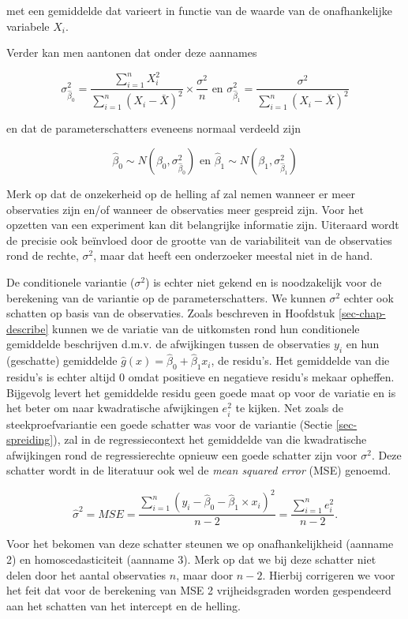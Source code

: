 \documentclass[
  dutch,
  letterpaper,
  12pt]{book}
\theoremstyle{definition}
\theoremstyle{definition}
\theoremstyle{definition}
\theoremstyle{remark}
\begin{document}
met een gemiddelde dat varieert in functie van de waarde van de
onafhankelijke variabele \(X_i\).

Verder kan men aantonen dat onder deze aannames

\[\sigma^2_{\hat{\beta}_0}=\frac{\sum\limits_{i=1}^n X^2_i}{\sum\limits_{i=1}^n (X_i-\bar X)^2} \times\frac{\sigma^2}{n} \text{ en } \sigma^2_{\hat{\beta}_1}=\frac{\sigma^2}{\sum\limits_{i=1}^n (X_i-\bar X)^2}\]

en dat de parameterschatters eveneens normaal verdeeld zijn

\[\hat\beta_0 \sim N\left(\beta_0,\sigma^2_{\hat \beta_0}\right) \text{ en } \hat\beta_1 \sim N\left(\beta_1,\sigma^2_{\hat \beta_1}\right)\]

Merk op dat de onzekerheid op de helling af zal nemen wanneer er meer
observaties zijn en/of wanneer de observaties meer gespreid zijn. Voor
het opzetten van een experiment kan dit belangrijke informatie zijn.
Uiteraard wordt de precisie ook beïnvloed door de grootte van de
variabiliteit van de observaties rond de rechte, \(\sigma^2\), maar dat
heeft een onderzoeker meestal niet in de hand.

De conditionele variantie (\(\sigma^2\)) is echter niet gekend en is
noodzakelijk voor de berekening van de variantie op de
parameterschatters. We kunnen \(\sigma^2\) echter ook schatten op basis
van de observaties. Zoals beschreven in Hoofdstuk
\ref{sec-chap-describe} kunnen we de variatie van de uitkomsten rond hun
conditionele gemiddelde beschrijven d.m.v. de afwijkingen tussen de
observaties \(y_i\) en hun (geschatte) gemiddelde
\(\hat{g}(x)=\hat{\beta}_0+\hat{\beta}_1x_i\), de residu's. Het
gemiddelde van die residu's is echter altijd 0 omdat positieve en
negatieve residu's mekaar opheffen. Bijgevolg levert het gemiddelde
residu geen goede maat op voor de variatie en is het beter om naar
kwadratische afwijkingen \(e_i^2\) te kijken. Net zoals de
steekproefvariantie een goede schatter was voor de variantie (Sectie
\ref{sec-spreiding}), zal in de regressiecontext het gemiddelde van die
kwadratische afwijkingen rond de regressierechte opnieuw een goede
schatter zijn voor \(\sigma^2\). Deze schatter wordt in de literatuur
ook wel de \emph{mean squared error} (MSE) genoemd.

\[\hat\sigma^2=MSE=\frac{\sum\limits_{i=1}^n \left(y_i-\hat\beta_0-\hat\beta_1\times x_i\right)^2}{n-2}=\frac{\sum\limits_{i=1}^n e^2_i}{n-2}.\]

Voor het bekomen van deze schatter steunen we op onafhankelijkheid
(aanname 2) en homoscedasticiteit (aanname 3). Merk op dat we bij deze
schatter niet delen door het aantal observaties \(n\), maar door
\(n-2\). Hierbij corrigeren we voor het feit dat voor de berekening van
MSE 2 vrijheidsgraden worden gespendeerd aan het schatten van het
intercept en de helling.
\end{document}
